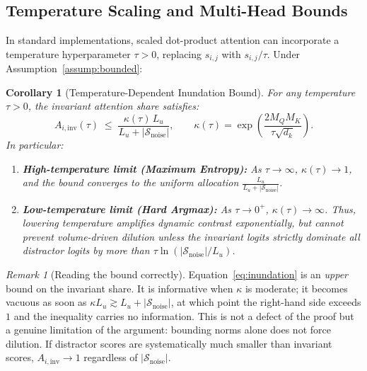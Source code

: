 ﻿\documentclass[11pt,a4paper]{article}
\theoremstyle{plain}
\newtheorem{corollary}{Corollary}
\theoremstyle{definition}
\theoremstyle{remark}
\newtheorem{remark}{Remark}
\begin{document}
\subsection{Temperature Scaling and Multi-Head Bounds}
\label{subsec:temp}

In standard implementations, scaled dot-product attention can incorporate a temperature hyperparameter $\tau > 0$, replacing $s_{i,j}$ with $s_{i,j}/\tau$. Under Assumption~\ref{assump:bounded}:

\begin{corollary}[Temperature-Dependent Inundation Bound]
\label{cor:temperature}
For any temperature $\tau > 0$, the invariant attention share satisfies:
\begin{equation}
  A_{i,\mathrm{inv}}(\tau)
  \;\le\;
  \frac{\kappa(\tau)\, L_u}{L_u + |\mathcal{S}_{\mathrm{noise}}|},
  \qquad
  \kappa(\tau) = \exp\!\left(\frac{2 M_Q M_K}{\tau \sqrt{d_k}}\right) .
  \label{eq:temp_bound}
\end{equation}
In particular:
\begin{enumerate}[label=(\roman*)]
  \item \textbf{High-temperature limit (Maximum Entropy):} As $\tau \to \infty$, $\kappa(\tau) \to 1$, and the bound converges to the uniform allocation $\frac{L_u}{L_u + |\mathcal{S}_{\mathrm{noise}}|}$.
  \item \textbf{Low-temperature limit (Hard Argmax):} As $\tau \to 0^+$, $\kappa(\tau) \to \infty$. Thus, lowering temperature amplifies dynamic contrast exponentially, but cannot prevent volume-driven dilution unless the invariant logits strictly dominate all distractor logits by more than $\tau \ln(|\mathcal{S}_{\mathrm{noise}}|/L_u)$.
\end{enumerate}
\end{corollary}

\begin{remark}[Reading the bound correctly]
\label{rem:reading}
Equation~\eqref{eq:inundation} is an \emph{upper} bound on the invariant share.
It is informative when $\kappa$ is moderate; it becomes vacuous as soon as
$\kappa L_u \gtrsim L_u + |\mathcal{S}_{\mathrm{noise}}|$, at which point the
right-hand side exceeds $1$ and the inequality carries no information. This is
not a defect of the proof but a genuine limitation of the argument: bounding
norms alone does not force dilution. If distractor scores are systematically
much smaller than invariant scores, $A_{i,\mathrm{inv}} \to 1$ regardless of
$|\mathcal{S}_{\mathrm{noise}}|$.
\end{remark}
\end{document}
